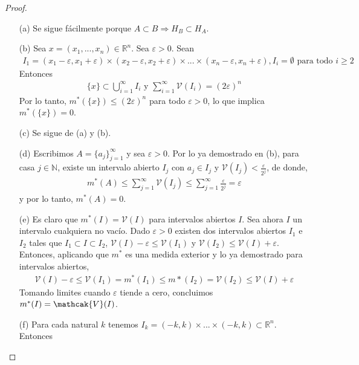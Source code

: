 \begin{proof}
\begin{enumerate}
    \item[(a)] Se sigue fácilmente porque $A \subset B \Longrightarrow H_B \subset H_A$.
    \item[(b)] Sea $x = (x_1,...,x_n) \in \mathbb{R}^n$. Sea $\varepsilon > 0$. Sean
    \begin{align*}
        I_1 = (x_1 - \varepsilon, x_1 + \varepsilon) \times (x_2 - \varepsilon, x_2 + \varepsilon) \times ... \times (x_n - \varepsilon, x_n + \varepsilon), I_i = \emptyset \text{ para todo } i\ge 2
    \end{align*}
    Entonces 
    \begin{align*}
        \{x\} \subset \bigcup_{i=1}^{\infty}{I_i} \text{ \ \ \ y \ \ \ } \sum_{i=1}^{\infty}{\mathcal{V}(I_i)} = (2\varepsilon)^n
    \end{align*}
    Por lo tanto, $m^*(\{x\}) \leq (2\varepsilon)^n$ para todo $\varepsilon > 0$, lo que implica $m^*(\{x\}) = 0$.
    \item[(c)] Se sigue de (a) y (b).
    \item[(d)] Escribimos $A = \{a_j\}_{j=1}^{\infty}$ y sea $\varepsilon > 0$. Por lo ya demostrado en (b), para casa $j \in \mathbb{N}$, existe un intervalo abierto $I_j$ con $a_j \in I_j$ y $\mathcal{V}(I_j) < \frac{\varepsilon}{2^j}$, de donde,
    \begin{align*}
        m^*(A) \leq \sum_{j=1}^{\infty}{\mathcal{V}(I_j)} \leq \sum_{j=1}^{\infty}{\frac{\varepsilon}{2^j}} = \varepsilon
    \end{align*}
    y por lo tanto, $m^*(A) = 0$.
    \item[(e)] Es claro que $m^*(I) = \mathcal{V}(I)$ para intervalos abiertos $I$.
    \newline
    Sea ahora $I$ un intervalo cualquiera no vacío. Dado $\varepsilon > 0$ existen dos intervalos abiertos $I_1$ e $I_2$ tales que $I_1 \subset I \subset I_2$, $\mathcal{V}(I) - \varepsilon \leq \mathcal{V}(I_1)$ y $\mathcal{V}(I_2) \leq \mathcal{V}(I) + \varepsilon$. Entonces, aplicando que $m^*$ es una medida exterior y lo ya demostrado para intervalos abiertos, 
    \begin{align*}
        \mathcal{V}(I) - \varepsilon \leq \mathcal{V}(I_1) = m^*(I_1) \leq m*(I_2) = \mathcal{V}(I_2) \leq \mathcal{V}(I) + \varepsilon
    \end{align*}
    Tomando limites cuando $\varepsilon$ tiende a cero, concluimos $m^*(I) = \mathcak{V}(I)$.
    \item[(f)] Para cada natural $k$ tenemos $I_k = (-k,k) \times ... \times (-k,k) \subset \mathbb{R}^n$. Entonces

\end{enumerate}
\end{proof}
